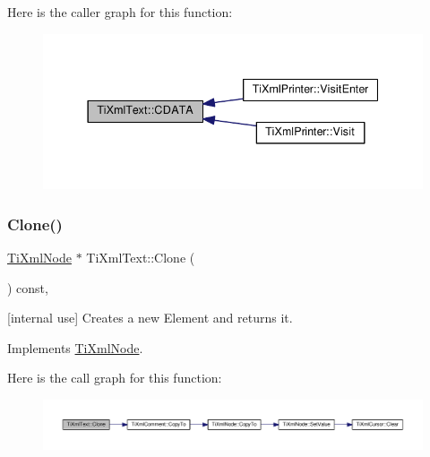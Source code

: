 Here is the caller graph for this function\+:
\nopagebreak
\begin{figure}[H]
\begin{center}
\leavevmode
\includegraphics[width=337pt]{class_ti_xml_text_aac1f4764d220ed6bf809b16dfcb6b45a_icgraph}
\end{center}
\end{figure}
\mbox{\label{class_ti_xml_text_a98a20d7a4f1c1478e25e34921be24bfe}} 
\subsubsection{\texorpdfstring{Clone()}{Clone()}}
{\footnotesize\ttfamily \hyperlink{class_ti_xml_node}{Ti\+Xml\+Node} $\ast$ Ti\+Xml\+Text\+::\+Clone (\begin{DoxyParamCaption}{ }\end{DoxyParamCaption}) const\hspace{0.3cm}{\ttfamily [protected]}, {\ttfamily [virtual]}}



\mbox{[}internal use\mbox{]} Creates a new Element and returns it. 



Implements \hyperlink{class_ti_xml_node_a4508cc3a2d7a98e96a54cc09c37a78a4}{Ti\+Xml\+Node}.

Here is the call graph for this function\+:
\nopagebreak
\begin{figure}[H]
\begin{center}
\leavevmode
\includegraphics[width=350pt]{class_ti_xml_text_a98a20d7a4f1c1478e25e34921be24bfe_cgraph}
\end{center}
\end{figure}
\mbox{\label{class_ti_xml_text_a480b8e0ad6b7833a73ecf2191195c9b5}} 
